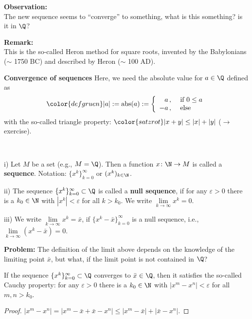 {\begin{itemize}
\begin{frame}
\vspace{0.15cm}
\textbf{Observation:}\\ The new sequence seems to ``converge'' to something, what is this something? is it in $\Q$? 

\textbf{Remark:}\\This is the so-called {\sc Heron} method for square roots, invented by the Babylonians ($\sim$ 1750 BC) and described by Heron ($\sim$ 100 AD).
\end{frame}


\begin{frame} 
\textbf{Convergence of sequences}
\vspace{-0.4cm}
Here, we need the absolute value for $a\in\Q$ defined as 
$$ \color{defgruen}
|a|:=\text{abs}(a):=\left\{
\begin{array}{rl}
a\, ,&\text{ if }0\le a\\
-a\, ,&\text{ else}
\end{array}
\right.
$$
with the so-called triangle property: $\color{satzrot}|x+y|\le|x|+|y|$ ($\rightarrow$ exercise).

\begin{defi}~\\[-2pt]
	\ite
	\item[i)] Let $M$ be a set (e.g., $M = \Q$). Then a function $x\colon \N \to M$ is called a \textbf{sequence}. Notation: $\{x^k\}_{k=0}^\infty$ or $(x^k)_{k\in \N}$.
	\item[ii)] The sequence  $\{x^k\}_{k=0}^\infty\subset\Q$ is called a \textbf{null sequence}, if for any $\varepsilon>0$ there is a $k_0\in\N$ with
	$|x^k|<\varepsilon$ for all $k>k_0$. We write $\lim\limits_{k\to\infty}x^k=0$.
	\item[iii)] We write $\lim\limits_{k\to\infty}x^k=\bar{x}$, if 
	$\{x^k-\bar{x}\}_{k=0}^\infty$ is a null sequence, i.e., 
	$\lim\limits_{k\to\infty}(x^k-\bar{x})=0$.
	\eti
\end{defi}

\textbf{Problem:} The definition of the limit above depends on the knowledge of the limiting point $\bar{x}$, but what, if the limit point is not contained in $\Q$?

\begin{theo}
	If the sequence  $\{x^k\}_{k=0}^\infty\subset\Q$ converges to $\bar{x}\in\Q$, then it satisfies the so-called {\sc Cauchy} property:
	for any $\varepsilon>0$ there is a $k_0\in\N$ with
	$|x^m-x^n|<\varepsilon$ for all $m,n>k_0$.
\end{theo}
\begin{proof}$|x^m-x^n|=|x^m-\bar{x}+\bar{x}-x^n|\le |x^m-\bar{x}|+|\bar{x}-x^n|$.
\end{proof}
\end{frame}



\end{itemize}}
